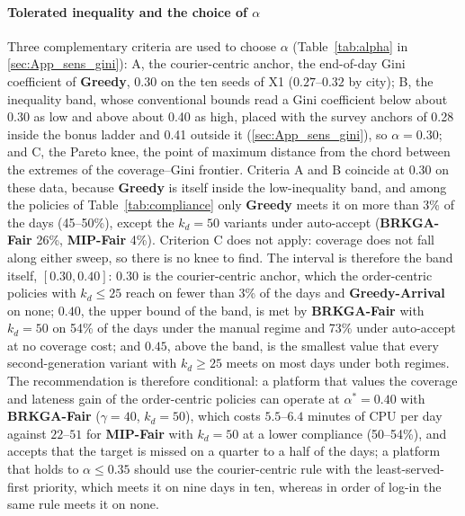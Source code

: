 \documentclass[a4paper,11pt,review,3p,authoryear]{elsarticle}
\begin{document}
\paragraph{Tolerated inequality and the choice of $\alpha$} Three complementary criteria are used to choose $\alpha$ (Table~\ref{tab:alpha} in \ref{sec:App_sens_gini}): A, the courier-centric anchor, the end-of-day Gini coefficient of \textbf{Greedy}, $0.30$ on the ten seeds of X1 ($0.27$--$0.32$ by city); B, the inequality band, whose conventional bounds read a Gini coefficient below about 0.30 as low and above about 0.40 as high, placed with the survey anchors of 0.28 inside the bonus ladder and 0.41 outside it (\ref{sec:App_sens_gini}), so $\alpha = 0.30$; and C, the Pareto knee, the point of maximum distance from the chord between the extremes of the coverage--Gini frontier. Criteria A and B coincide at $0.30$ on these data, because \textbf{Greedy} is itself inside the low-inequality band, and among the policies of Table~\ref{tab:compliance} only \textbf{Greedy} meets it on more than 3\% of the days (45--50\%), except the $k_d = 50$ variants under auto-accept (\textbf{BRKGA-Fair} 26\%, \textbf{MIP-Fair} 4\%). Criterion C does not apply: coverage does not fall along either sweep, so there is no knee to find. The interval is therefore the band itself, $[0.30, 0.40]$: $0.30$ is the courier-centric anchor, which the order-centric policies with $k_d \le 25$ reach on fewer than 3\% of the days and \textbf{Greedy-Arrival} on none; $0.40$, the upper bound of the band, is met by \textbf{BRKGA-Fair} with $k_d = 50$ on 54\% of the days under the manual regime and 73\% under auto-accept at no coverage cost; and $0.45$, above the band, is the smallest value that every second-generation variant with $k_d \ge 25$ meets on most days under both regimes. The recommendation is therefore conditional: a platform that values the coverage and lateness gain of the order-centric policies can operate at $\alpha^* = 0.40$ with \textbf{BRKGA-Fair} ($\gamma = 40$, $k_d = 50$), which costs $5.5$--$6.4$ minutes of CPU per day against $22$--$51$ for \textbf{MIP-Fair} with $k_d = 50$ at a lower compliance (50--54\%), and accepts that the target is missed on a quarter to a half of the days; a platform that holds to $\alpha \le 0.35$ should use the courier-centric rule with the least-served-first priority, which meets it on nine days in ten, whereas in order of log-in the same rule meets it on none.
\end{document}

